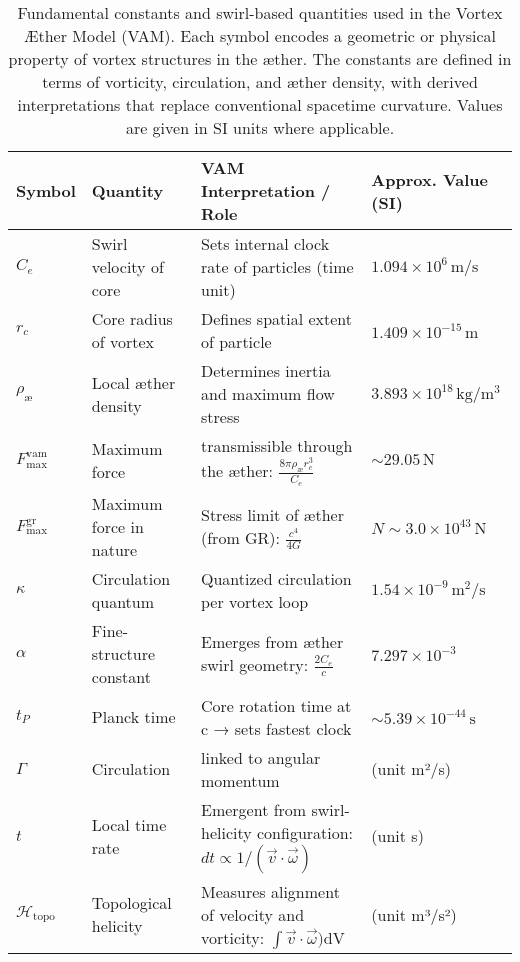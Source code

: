 \begin{table}[h!]
    \centering
    \footnotesize
    \begin{tabular}{|l|l|l|l|}
        \hline
        \toprule
        \textbf{Symbol} & \textbf{Quantity} & \textbf{VAM Interpretation / Role} & \textbf{Approx. Value (SI)} \\
        \hline
        \midrule
        $C_e$ & Swirl velocity of core & Sets internal clock rate of particles (time unit) & $1.094 \times 10^6 \,\mathrm{m/s} $\\
        $r_c$ & Core radius of vortex & Defines spatial extent of particle & $1.409 \times 10^{-15} \,\mathrm{m}$ \\
        $\rho_\text{\ae}$ & Local æther density & Determines inertia and maximum flow stress & $3.893 \times 10^{18} \,\mathrm{kg/m^3}$ \\
        $F^{\text{vam}}_\text{max}$ & Maximum force & transmissible through the æther: $\frac{8\pi \rho_\text{\ae} r_c^3}{C_e}$ & $\sim 29.05\,\mathrm{N}$ \\
        $F^{\text{gr}}_\text{max}$ & Maximum force in nature & Stress limit of æther (from GR): $\frac{c^4}{4G}$ &  $N\sim 3.0 \times 10^{43} \,\mathrm{N}$ \\
        $\kappa$ & Circulation quantum & Quantized circulation per vortex loop & $1.54 \times 10^{-9} \,\mathrm{m^2/s}$ \\
        $\alpha$ & Fine-structure constant & Emerges from æther swirl geometry: $\frac{2 C_e}{c}$ & $7.297 \times 10^{-3} $\\
        $t_P$ & Planck time & Core rotation time at c → sets fastest clock & $\sim 5.39 \times 10^{-44} \,\mathrm{s} $\\
        $\Gamma$ & Circulation & linked to angular momentum & (unit m²/s) \\
        $t$ & Local time rate & Emergent from swirl-helicity configuration: $dt \propto 1 / (\vec{v} \cdot \vec{\omega})$  & (unit s) \\
        $\mathcal{H}_\text{topo}$ & Topological helicity  & Measures alignment of velocity and vorticity: $\int \vec{v} \cdot \vec{\omega})$dV & (unit m³/s²)\\
        \hline
        \bottomrule
    \end{tabular}
    \caption{Fundamental constants and swirl-based quantities used in the Vortex Æther Model (VAM). Each symbol encodes a geometric or physical property of vortex structures in the æther. The constants are defined in terms of vorticity, circulation, and æther density, with derived interpretations that replace conventional spacetime curvature. Values are given in SI units where applicable.}
    \label{tab:VAM_master_table}
\end{table}

